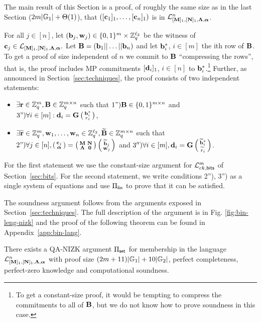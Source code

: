 The main result of this Section is a proof, of roughly the same size as in the last Section ($2{m}|\mathbb{G}_1|+\Theta(1)$), that  $([\mathbf{c}_1]_1,\ldots,[\mathbf{c}_n]_1)$ is in $\mathcal{L}_{[\mathbf{{M}}]_1,[\mathbf{{N}}]_1,\mathbf{{\Lambda}},{\boldsymbol \alpha}}^n$.

For all $j \in [n]$, let $(\mathbf{b}_j,\mathbf{w}_j) \in \{0,1\}^{{m}} \times \mathbb{Z}_q^{{\ell_2}}$ be the witness of $\mathbf{c}_j \in \mathcal{L}_{[\mathbf{{M}}]_1,[\mathbf{{N}}]_1,\mathbf{{\Lambda}},{\boldsymbol \alpha}}.$ Let $\mathbf{{B}}=(\mathbf{b}_1|| \ldots ||\mathbf{b}_n)$ and let $\mathbf{b}^*_{i}$, $i \in [m]$ the ith row of $\mathbf{{B}}$. To get a proof of size independent of $n$ we commit to $\mathbf{{B}}$ ``compressing the rows'', that is, the proof includes MP commitments $[\mathbf{d}_i]_1$, $i \in [n]$ to $\mathbf{b}_i^*$.\footnote{To get a constant-size proof, it would be tempting to compress the commitments to all of $\mathbf{{B}}$, but we do not know how to prove soundness in this case.} Further, as announced in Section~\ref{sec:techniques}, the proof consists of two independent statements:
\begin{itemize}
\item $\exists \mathbf{r} \in \mathbb{Z}_q^{m}, \mathbf{{B}} \in \mathbb{Z}_q^{{m} \times n}$ such that  
$\text{1'')} \mathbf{{B}} \in \{0,1\}^{{m} \times n}$ and $\text{3'')} \forall i \in [{m}]: \mathbf{d}_i=\mathbf{{G}}\left(\begin{smallmatrix}\mathbf{b}_i^*  \\ r_i\end{smallmatrix}\right)$,
\item $\exists \widetilde{\mathbf{r}} \in \mathbb{Z}_q^{m}, \mathbf{w}_1,\ldots,\mathbf{w}_n \in\mathbb{Z}_q^{\ell_2}, \widetilde{\mathbf{{B}}} \in \mathbb{Z}_q^{{m} \times n}$ such that  
   $\text{2'')}\forall j \in [n], \left(\begin{smallmatrix}
    \mathbf{c}_j\\
    {\boldsymbol \alpha}
\end{smallmatrix}\right)
=
\left(\begin{smallmatrix}
    \mathbf{{M}}       & \mathbf{{N}}\\
    \mathbf{{\Lambda}} & \mathbf{{0}}
\end{smallmatrix}\right)
\left(\begin{smallmatrix}
    \widetilde{\mathbf{b}}_j\\
    \mathbf{w}_j
\end{smallmatrix}\right)$ and $3'') \forall i \in [{m}], \mathbf{d}_i=\mathbf{{G}}   \left(\begin{smallmatrix}\widetilde{\mathbf{b}}^*_i  \\ \widetilde{r}_i\end{smallmatrix}\right)  $.
\end{itemize} 
For the first statement we use the constant-size argument for $\mathcal{L}_{ck,\mathsf{bits}}^m$ of Section~\ref{sec:bits}. For the second statement, we write conditions 2''), 3'') as a single system of equations and use $\Pi_{\mathsf{lin}}$ to prove that it can be satisfied. 

The soundness argument follows from the arguments exposed in Section~\ref{sec:techniques}. The full description of the argument is in Fig. \ref{fig:bin-leng-nizk} and the proof of the following theorem can be found in Appendix~\ref{app:bin-lang}.


\begin{theorem} \label{theo:aggset} There exists a QA-NIZK argument $\Pi_{\mathsf{set}}$ for membership in the language $\mathcal{L}_{[\mathbf{{M}}]_1,[\mathbf{{N}}]_1,\mathbf{{\Lambda}},{\boldsymbol \alpha}}^n$ with proof size  $(2{m}+11)|\mathbb{G}_1|+10|\mathbb{G}_2|$, perfect completeness, perfect-zero knowledge and computational soundness. 
\end{theorem}

